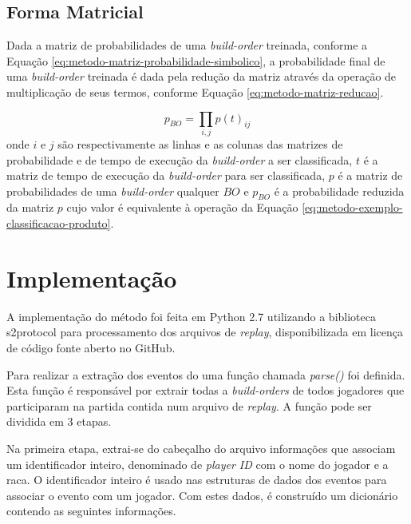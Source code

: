 			\subsection{Forma Matricial}
Dada a matriz de probabilidades de uma \textit{\gls{build-order}} treinada, conforme a Equação \ref{eq:metodo-matriz-probabilidade-simbolico}, a probabilidade final de uma \textit{\gls{build-order}} treinada é dada pela redução da matriz através da operação de multiplicação de seus termos, conforme Equação \ref{eq:metodo-matriz-reducao}.

\begin{equation}
	p_{BO} = \prod_{i,j} p(t)_{ij}
	\label{eq:metodo-matriz-reducao}
\end{equation}
\noindent onde $i$ e $j$ são respectivamente as linhas e as colunas das matrizes de probabilidade e de tempo de execução da \textit{\gls{build-order}} a ser classificada, $t$ é a matriz de tempo de execução da \textit{\gls{build-order}} para ser classificada, $p$ é a matriz de probabilidades de uma \textit{\gls{build-order}} qualquer $BO$ e $p_{BO}$ é a probabilidade reduzida da matriz $p$ cujo valor é equivalente à operação da Equação \ref{eq:metodo-exemplo-classificacao-produto}.

		\section{Implementação}

A implementação do método foi feita em Python 2.7 utilizando a biblioteca s2protocol \cite{s2protocol} para processamento dos arquivos de \textit{\gls{replay}}, disponibilizada em licença de código fonte aberto no GitHub.

Para realizar a extração dos eventos do uma função chamada \textit{\textit{parse()}} foi definida. Esta função é responsável por extrair todas a \textit{\glspl{build-order}} de todos jogadores que participaram na partida contida num arquivo de \textit{\gls{replay}}. A função pode ser dividida em 3 etapas.

Na primeira etapa, extrai-se do cabeçalho do arquivo informações que associam um identificador inteiro, denominado de \textit{player ID} com o nome do jogador e a \gls{raca}. O identificador inteiro é usado nas estruturas de dados dos eventos para associar o evento com um jogador. Com estes dados, é construído um dicionário contendo as seguintes informações.

